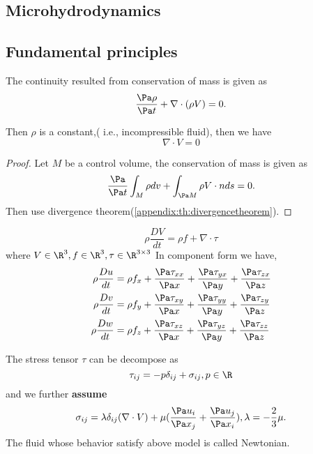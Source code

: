 
\begin{refsection}
\startcontents[chapters]	
\chapter{Microhydrodynamics}\label{ch:microhydrodynamics}
	


\section{Fundamental principles}


\begin{theorem}\label{ch:numerical-methods:th:continuityequation}
	The continuity resulted from conservation of mass is given as
	$$\frac{\Pa \rho}{\Pa t} + \nabla \cdot (\rho  V) = 0.$$
	
	Then $\rho$ is a constant,( i.e., incompressible fluid), then
	we have
	$$\nabla \cdot V = 0$$
\end{theorem}
\begin{proof}
	Let $M$ be a control volume, the conservation of mass is given as
	$$\frac{\Pa}{\Pa t}\int_M \rho dv + \int_{\Pa M} \rho V\cdot n ds = 0.$$
	Then use divergence theorem(\autoref{appendix:th:divergencetheorem}). 
\end{proof}


\begin{theorem}\label{ch:numerical-methods:th:conservationofmomentum}
	$$\rho \frac{DV}{dt} = \rho f + \nabla\cdot \tau$$	
	where $V\in \R^3, f\in \R^3, \tau \in \R^{3\times 3}$
	In component form we have, 
	\begin{align*}
	\rho \frac{Du}{dt} &= \rho f_x + \frac{\Pa \tau_{xx}}{\Pa x} + \frac{\Pa \tau_{yx}}{\Pa y}+\frac{\Pa \tau_{zx}}{\Pa z} \\
	\rho \frac{Dv}{dt} &= \rho f_y + \frac{\Pa \tau_{xy}}{\Pa x} + \frac{\Pa \tau_{yy}}{\Pa y}+\frac{\Pa \tau_{zy}}{\Pa z} \\
	\rho \frac{Dw}{dt} &= \rho f_z + \frac{\Pa \tau_{xz}}{\Pa x} + \frac{\Pa \tau_{yz}}{\Pa y}+\frac{\Pa \tau_{zz}}{\Pa z} \\
	\end{align*}
\end{theorem}

\begin{remark}\label{ch:numerical-methods:remark:tensorstressmodel}
	The stress tensor $\tau$ can be decompose as
	$$\tau_{ij} = -p\delta_{ij} + \sigma_{ij}, p\in \R$$
	and we further \textbf{assume}
	$$\sigma_{ij} = \lambda \delta_{ij}(\nabla \cdot V) + \mu (\frac{\Pa u_i}{\Pa x_j}+\frac{\Pa u_j}{\Pa x_i}), \lambda = -\frac{2}{3}\mu.$$
	The fluid whose behavior satisfy above model is called Newtonian.	
\end{remark}



\end{refsection}
